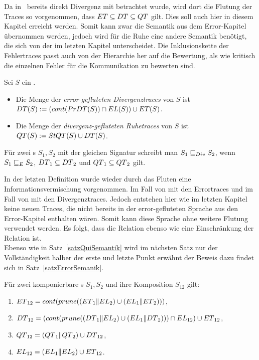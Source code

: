 Da in~\cite{Chilton2013} bereits direkt Divergenz mit betrachtet wurde, wird
dort die Flutung der Traces so vorgenommen, dass $ET\subseteq DT\subseteq
QT$ gilt. Dies soll auch hier in diesem Kapitel erreicht werden. Somit kann
zwar die Semantik aus dem Error-Kapitel übernommen werden, jedoch wird für die
Ruhe eine andere Semantik benötigt, die sich von der im letzten Kapitel
unterscheidet. Die Inklusionskette der Fehlertraces passt auch von der
Hierarchie her auf die Bewertung, als wie kritisch die einzelnen
Fehler für die Kommunikation zu bewerten sind.

\begin{Def}
\label{DefRuheDivSemantik}
  Sei $S$ ein \EIO{}.
  \begin{itemize}
    \item Die Menge der \emph{error-gefluteten Divergenztraces} von $S$ ist\\
      $DT{}(S) := (cont{}(PrDT{}(S))\cap EL{}(S))\cup ET{}(S)$.
    \item Die Menge der \emph{divergenz-gefluteten Ruhetraces} von $S$ ist\\
      $QT{}(S) := StQT{}(S)\cup DT{}(S)$.
  \end{itemize}
  Für zwei \EIO{}s $S_1, S_2$ mit der gleichen Signatur schreibt man $S_1\sqsubseteq _{Div}
  S_2$, wenn $S_1\sqsubseteq _E S_2$, $DT{}_1\subseteq DT{}_2$ und
  $QT{}_1\subseteq QT{}_2$ gilt.
\end{Def}

In der letzten Definition wurde wieder durch das Fluten eine
Informationsvermischung vorgenommen. Im Fall von \DT{} mit den Errortraces und
im Fall von \QT{} mit den Divergenztraces. Jedoch entstehen hier wie im letzten
Kapitel keine neuen Traces, die nicht bereits in der error-gefluteten Sprache
\EL{} aus den Error-Kapitel enthalten wären. Somit kann diese Sprache ohne
weitere Flutung verwendet werden. Es folgt, dass die Relation \DRel{} ebenso
wie \QRel{} eine Einschränkung der Relation \ERel{} ist.\\
Ebenso wie in Satz~\ref{satzQuiSemantik} wird im nächsten Satz nur der
Vollständigkeit halber der erste und letzte Punkt erwähnt der Beweis dazu
findet sich in Satz~\ref{satzErrorSemanik}.

\begin{satz}
\label{satzDivSemantik}
  Für zwei komponierbare \EIO{}s $S_1, S_2$ und ihre Komposition
  $S_{12}$ gilt:
  \begin{enumerate}
    \item $ET{}_{12}=cont (prune ((ET{}_1\|EL{}_2)\cup
      (EL{}_1\|ET{}_2)))$,
    \item $DT{}_{12}= (cont{}(prune{}((DT{}_1\|EL{}_2)\cup
      (EL{}_1\|DT{}_2)))\cap EL_{12})\cup ET{}_{12}$,
    \item $QT{}_{12}=(QT{}_1\|QT{}_2)\cup DT{}_{12}$,
    \item $EL{}_{12}=(EL{}_1\|EL{}_2)\cup ET{}_{12}$.
  \end{enumerate}
\end{satz}

